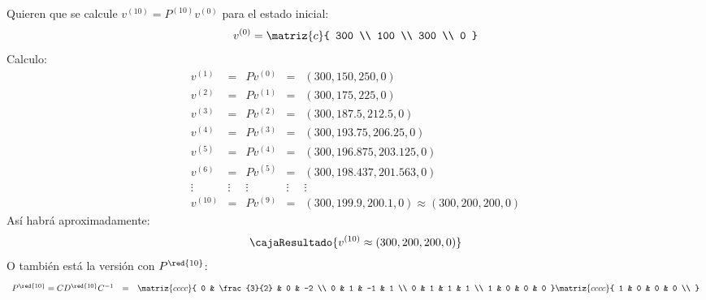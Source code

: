 \begin{enumerate}[label=(\alph*)]
        Quieren que se calcule $v^{(10)} = P^{(10)}v^{(0)}$ para el estado inicial:
        $$
          v^{(0)}=
          \matriz{c}{
            300     \\
            100     \\
            300     \\
            0
          }
        $$
        Calculo:
        $$
          \begin{array}{rcccl}
            v^{(1)}  & =      & P v^{(0)} & =      & (300, 150, 250, 0)                                \\
            v^{(2)}  & =      & P v^{(1)} & =      & (300, 175, 225, 0)                                \\
            v^{(3)}  & =      & P v^{(2)} & =      & (300, 187.5, 212.5, 0)                            \\
            v^{(4)}  & =      & P v^{(3)} & =      & (300, 193.75, 206.25, 0)                          \\
            v^{(5)}  & =      & P v^{(4)} & =      & (300, 196.875, 203.125, 0)                        \\
            v^{(6)}  & =      & P v^{(5)} & =      & (300, 198.437, 201.563, 0)                        \\
            \vdots   & \vdots & \vdots    & \vdots & \vdots                                            \\
            v^{(10)} & =      & P v^{(9)} & =      & (300, 199.9, 200.1, 0) \approx (300, 200, 200, 0)
          \end{array}
        $$
        Así habrá aproximadamente:
        $$
          \cajaResultado{
            v^{(10)} \approx (300, 200, 200, 0)
          }
        $$
        O también está la versión con $P^{\red{10}}$:
        $$
          \begin{array}{rcl}
            P^{\red{10}} = C D^{\red{10}} C^{-1}
                         & =            &
            \matriz{cccc}{
            0            & \frac{3}{2}  & 0                        & -2                        \\
            0            & 1            & -1                       & 1                         \\
            0            & 1            & 1                        & 1                         \\
            1            & 0            & 0                        & 0
            }
            \matriz{cccc}{
            1            & 0            & 0                        & 0                         \\
}
\end{array}$$
\end{enumerate}

